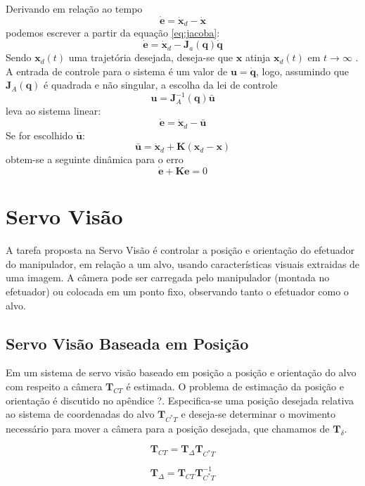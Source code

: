 Derivando em relação ao tempo
\begin{equation}
\bm{\dot{e}} = \bm{\dot{x}}_d - \bm{\dot{x}}
\end{equation}
podemos escrever a partir da equação \ref{eq:jacoba}:
\begin{equation}
\bm{\dot{e}} = \bm{\dot{x}}_d - \bm{J}_a(\bm{q})\dot{\bm{q}}
\end{equation}
Sendo $\bm{x}_d(t)$ uma trajetória desejada, deseja-se que $\bm{x}$ atinja $\bm{x}_d(t)$ em $t \to \infty$ .
A entrada de controle para o sistema é um valor de $\bm{u} = \dot{\bm{q}}$, logo, assumindo que $\bm{J}_A(\bm{q})$ é quadrada e não singular, a escolha da lei de controle
\begin{equation}
\bm{u} = \bm{J}_A^{-1}(\bm{q})\bar{\bm{u}}
\end{equation}
leva ao sistema linear:
\begin{equation}
\dot{\bm{e}} = \dot{\bm{x}}_d - \bar{\bm{u}}
\end{equation}
Se for escolhido $\bar{\bm{u}}$:
\begin{equation}
\bar{\bm{u}} = \dot{\bm{x}}_d + \bm{K} (\bm{x}_d - \bm{x})
\end{equation}
obtem-se a seguinte dinâmica para o erro
\begin{equation}
\dot{\bm{e}} + \bm{K} \bm{e} = 0
\end{equation}

\section{Servo Visão}
A tarefa proposta na Servo Visão é controlar a posição e orientação do efetuador do manipulador, em relação a um alvo, usando características visuais extraidas de uma imagem. A câmera pode ser carregada pelo manipulador (montada no efetuador) ou colocada em um ponto fixo, observando tanto o efetuador como o alvo.

\subsection{Servo Visão Baseada em Posição}
Em um sistema de servo visão baseado em posição a posição e orientação do alvo com respeito a câmera $\bm{T}_{CT}$ é estimada. O problema de estimação da posição e orientação é discutido no apêndice ?.
Especifica-se uma posição desejada relativa ao sistema de coordenadas do alvo  $\bm{T}_{C^*T}$ e deseja-se determinar o movimento necessário para mover a câmera para a posição desejada, que chamamos de $\bm{T}_\delta$.

\begin{equation}
 \bm{T}_{CT} =  \bm{T}_\Delta \bm{T}_{C^*T}
\end{equation}

\begin{equation}
 \bm{T}_\Delta  =   \bm{T}_{CT} \bm{T}_{C^*T}^{-1}
\end{equation}